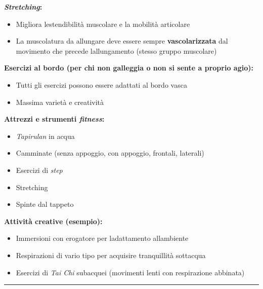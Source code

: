 \documentclass[a4paper,11pt]{article}
\providecommand{\tightlist}{%
  \setlength{\itemsep}{0pt}\setlength{\parskip}{0pt}}
\begin{document}
\textbf{\emph{Stretching}:}

\begin{itemize}
      \tightlist
      \item
            Migliora l\textquotesingle estendibilità muscolare e la mobilità
            articolare
      \item
            La muscolatura da allungare deve essere sempre \textbf{vascolarizzata}
            dal movimento che precede l\textquotesingle allungamento (stesso
            gruppo muscolare)
\end{itemize}

\textbf{Esercizi al bordo (per chi non galleggia o non si sente a
      proprio agio):}

\begin{itemize}
      \tightlist
      \item
            Tutti gli esercizi possono essere adattati al bordo vasca
      \item
            Massima varietà e creatività
\end{itemize}

\textbf{Attrezzi e strumenti \emph{fitness}:}

\begin{itemize}
      \tightlist
      \item
            \emph{Tapirulan} in acqua
      \item
            Camminate (senza appoggio, con appoggio, frontali, laterali)
      \item
            Esercizi di \emph{step}
      \item
            Stretching
      \item
            Spinte dal tappeto
\end{itemize}

\textbf{Attività creative (esempio):}

\begin{itemize}
      \tightlist
      \item
            Immersioni con erogatore per l\textquotesingle adattamento
            all\textquotesingle ambiente
      \item
            Respirazioni di vario tipo per acquisire tranquillità
            sott\textquotesingle acqua
      \item
            Esercizi di \emph{Tai Chi} subacquei (movimenti lenti con respirazione
            abbinata)
\end{itemize}

\begin{center}\rule{0.5\linewidth}{0.5pt}\end{center}
\end{document}
